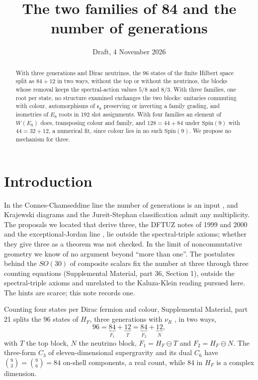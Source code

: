 \documentclass[aps,prd,reprint,onecolumn,nofootinbib,amsmath,amssymb,floatfix]{revtex4-2}
\theoremstyle{plain}
\newcommand{\supp}[1]{Supplemental Material, part #1}
\begin{document}
\title{The two families of 84 and the number of generations}
\date{Draft, 4 November 2026}

\begin{abstract}
With three generations and Dirac neutrinos, the 96 states of the finite Hilbert space split as $84+12$ in two ways, without the top or without the neutrinos, the blocks whose removal keeps the spectral-action values $5/8$ and $8/3$. With three families, one root per state, no structure examined exchanges the two blocks: unitaries commuting with colour, automorphisms of $\mathfrak e_8$ preserving or inverting a family grading, and isometries of $E_8$ roots in 192 slot assignments. With four families an element of $W(E_8)$ does, transposing colour and family, and $128=44+84$ under $\mathrm{Spin}(9)$ with $44=32+12$, a numerical fit, since colour lies in no such $\mathrm{Spin}(9)$. We propose no mechanism for three.
\end{abstract}

\maketitle

\section{Introduction}

In the Connes-Chamseddine line the number of generations is an input \cite{CC2008,CC2007}, and Krajewski diagrams \cite{Krajewski1998} and the Jureit-Stephan classification \cite{JS2005} admit any multiplicity. The proposals we located that derive three, the DFTUZ notes of 1999 and 2000 \cite{Rivero1999,Rivero2000} and the exceptional-Jordan line \cite{DV2016,Boyle2026}, lie outside the spectral-triple axioms; whether they give three as a theorem was not checked. In the limit of noncommutative geometry we know of no argument beyond ``more than one''. The postulates behind the $SO(30)$ of composite scalars \cite{Rivero2005} fix the number at three through three counting equations (\supp{36}, Section 1), outside the spectral-triple axioms and unrelated to the Kaluza-Klein reading pursued here. The hints are scarce; this note records one.

Counting four states per Dirac fermion and colour, \supp{21} splits the 96 states of $H_F$, three generations with $\nu_R$ \cite{CCM2007}, in two ways,
\begin{equation}\label{eq:two}
96=\underbrace{84}_{F_1}+\underbrace{12}_{T}=\underbrace{84}_{F_2}+\underbrace{12}_{N},
\end{equation}
with $T$ the top block, $N$ the neutrino block, $F_1=H_F\ominus T$ and $F_2=H_F\ominus N$. The three-form $C_3$ of eleven-dimensional supergravity and its dual $C_6$ have $\binom93=\binom96=84$ on-shell components, a real count, while 84 in $H_F$ is a complex dimension.
\end{document}
